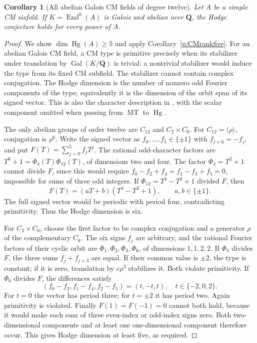 \documentclass[11pt,reqno]{article}
\theoremstyle{emphasizedplain}
\newtheorem{corollary}[theorem]{Corollary}
\theoremstyle{emphasizeddefinition}
\theoremstyle{emphasizeddefinition}
\DeclareMathOperator{\End}{End}
\DeclareMathOperator{\Hg}{Hg}
\DeclareMathOperator{\MT}{MT}
\newcommand{\Q}{\mathbf Q}
\begin{document}
\begin{corollary}[All abelian Galois CM fields of degree twelve]
\label{p:CMabelian}
Let $A$ be a simple CM sixfold. If $K=\End^0(A)$ is Galois and
abelian over $\Q$, the Hodge conjecture holds for every power of $A$.
\end{corollary}
\begin{proof}
We show $\dim\Hg(A)\ge5$ and apply Corollary~\ref{p:CMrankfive}.
For an abelian Galois CM field, a CM type is primitive precisely when
its stabilizer under translation by $\operatorname{Gal}(K/\Q)$ is
trivial: a nontrivial stabilizer would induce the type from its fixed
CM subfield. The stabilizer cannot contain complex conjugation.
The Hodge dimension is the number of nonzero odd Fourier components
of the type; equivalently it is the dimension of the orbit span of
its signed vector. This is also the character description in
\cite[\S1]{Yanai}, with the scalar component omitted when passing
from $\MT$ to $\Hg$.

The only abelian groups of order twelve are $C_{12}$ and $C_2\times C_6$.
For $C_{12}=\langle\rho\rangle$, conjugation is $\rho^6$.
Write the signed vector as $f_0,\ldots,f_5\in\{\pm1\}$ with
$f_{j+6}=-f_j$, and put $F(T)=\sum_{j=0}^5 f_jT^j$.
The rational odd-character factors are
$T^6+1=\Phi_4(T)\Phi_{12}(T)$, of dimensions two and four.
The factor $\Phi_4=T^2+1$ cannot divide $F$, since this would require
$f_0-f_2+f_4=f_1-f_3+f_5=0$, impossible for sums of three odd integers.
If $\Phi_{12}=T^4-T^2+1$ divided $F$, then
\[
 F(T)=(aT+b)(T^4-T^2+1),\qquad a,b\in\{\pm1\}.
\]
The full signed vector would be periodic with period four, contradicting
primitivity. Thus the Hodge dimension is six.

For $C_2\times C_6$, choose the first factor to be complex conjugation
and a generator $\rho$ of the complementary $C_6$. The six signs
$f_j$ are arbitrary, and the rational Fourier factors of their cyclic
orbit are $\Phi_1,\Phi_2,\Phi_3,\Phi_6$, of dimensions $1,1,2,2$.
If $\Phi_3$ divides $F$, the three sums $f_j+f_{j+3}$ are equal.
If their common value is $\pm2$, the type is constant; if it is zero,
translation by $c\rho^3$ stabilizes it. Both violate primitivity.
If $\Phi_6$ divides $F$, the differences satisfy
\[
 (f_0-f_3,f_1-f_4,f_2-f_5)=(t,-t,t),\quad t\in\{-2,0,2\}.
\]
For $t=0$ the vector has period three; for $t=\pm2$ it has period two.
Again primitivity is violated. Finally $F(1)=F(-1)=0$ cannot both
hold, because it would make each sum of three even-index or odd-index
signs zero. Both two-dimensional components and at least one
one-dimensional component therefore occur. This gives Hodge dimension
at least five, as required.
\end{proof}
\end{document}
